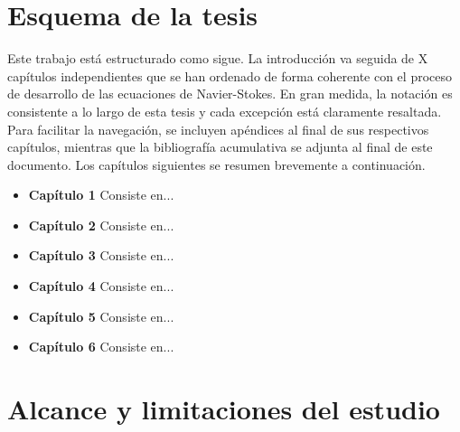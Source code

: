 \section{Esquema de la tesis}
Este trabajo está estructurado como sigue. La introducción va seguida de X capítulos independientes que se han ordenado de forma coherente con el proceso de desarrollo de las ecuaciones de Navier-Stokes. En gran medida, la notación es consistente a lo largo de esta tesis y cada excepción está claramente resaltada. Para facilitar la navegación, se incluyen apéndices al final de sus respectivos capítulos, mientras que la bibliografía acumulativa se adjunta al final de este documento. Los capítulos siguientes se resumen brevemente a continuación.
\begin{itemize}
    \item \textbf{Capítulo 1} Consiste en...
    \item \textbf{Capítulo 2} Consiste en...
    \item \textbf{Capítulo 3} Consiste en...
    \item \textbf{Capítulo 4} Consiste en...
    \item \textbf{Capítulo 5} Consiste en...
    \item \textbf{Capítulo 6} Consiste en...
\end{itemize}


\section{Alcance y limitaciones del estudio}










